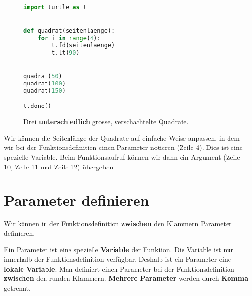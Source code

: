 \begin{figure}[htb]
\centering
\begin{minipage}[c][4cm]{0.4\linewidth}
\centering
{}
\caption{Drei \textbf{unterschiedlich} grosse, verschachtelte Quadrate.}
\label{figure-drei-quadrate-1}
\end{minipage}
\hfill
\begin{minipage}[c]{0.55\linewidth}
\centering
\begin{lstlisting}[language=python, caption={Drei Funktionsaufrufe mit Argument (\graybgtexttt{drei\_quadrate\_1.py}).}, label={lst-drei-quadrate-1}]
import turtle as t


def quadrat(seitenlaenge):
    for i in range(4):
        t.fd(seitenlaenge)
        t.lt(90)


quadrat(50)
quadrat(100)
quadrat(150)

t.done()
\end{lstlisting}
\end{minipage}
\end{figure}

Wir können die Seitenlänge der Quadrate auf einfache Weise anpassen, in dem wir bei der Funktionsdefinition einen Parameter notieren (Zeile 4). Dies ist eine spezielle Variable. Beim Funktionsaufruf können wir dann ein Argument (Zeile 10, Zeile 11 und Zeile 12) übergeben.

\section{Parameter definieren}

Wir können in der Funktionsdefinition \textbf{zwischen} den Klammern Parameter definieren.

\begin{definition}[Parameter]
Ein Parameter ist eine spezielle \textbf{Variable} der Funktion. Die Variable ist nur innerhalb der Funktionsdefinition verfügbar. Deshalb ist ein Parameter eine \textbf{lokale Variable}. Man definiert einen Parameter bei der Funktionsdefinition \textbf{zwischen} den runden Klammern. \textbf{Mehrere Parameter} werden durch \textbf{Komma} getrennt.
\end{definition}

